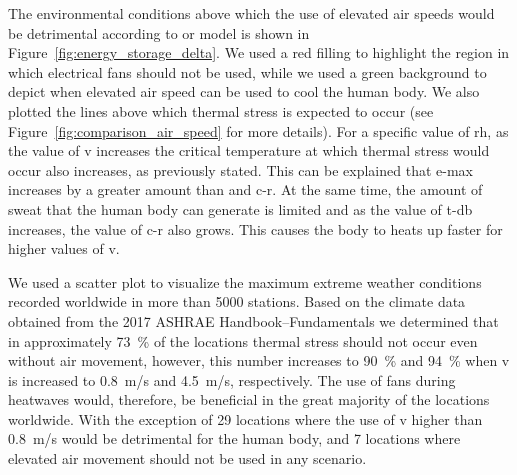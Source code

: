 The environmental conditions above which the use of elevated air speeds would be detrimental according to or model is shown in Figure~\ref{fig:energy_storage_delta}.
We used a red filling to highlight the region in which electrical fans should not be used, while we used a green background to depict when elevated air speed can be used to cool the human body.
We also plotted the lines above which thermal stress is expected to occur (see Figure~\ref{fig:comparison_air_speed} for more details).
For a specific value of \ac{rh}, as the value of \ac{v} increases the critical temperature at which thermal stress would occur also increases, as previously stated.
This can be explained that \ac{e-max} increases by a greater amount than and \ac{c-r}.
At the same time, the amount of sweat that the human body can generate is limited and as the value of \ac{t-db} increases, the value of \ac{c-r} also grows.
This causes the body to heats up faster for higher values of \ac{v}.

We used a scatter plot to visualize the maximum extreme weather conditions recorded worldwide in more than 5000 stations.
Based on the climate data obtained from the 2017 ASHRAE Handbook--Fundamentals we determined that in approximately 73~\% of the locations thermal stress should not occur even without air movement, however, this number increases to 90~\% and 94~\% when \ac{v} is increased to 0.8~m/s and 4.5~m/s, respectively.
The use of fans during heatwaves would, therefore, be beneficial in the great majority of the locations worldwide.
With the exception of 29 locations where the use of \ac{v} higher than 0.8~m/s would be detrimental for the human body, and 7 locations where elevated air movement should not be used in any scenario.



